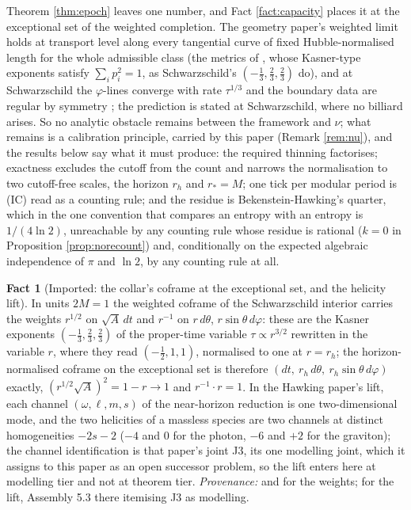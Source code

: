 \documentclass[11pt]{article}
\theoremstyle{definition}
\newtheorem{fact}[theorem]{Fact}
\begin{document}
Theorem \ref{thm:epoch} leaves one number, and Fact \ref{fact:capacity} places it at the exceptional set of the weighted completion. The geometry paper's weighted limit holds at transport level along every tangential curve of fixed Hubble-normalised length for the whole admissible class (the metrics of \cite[Def.~5.5]{ButlerT6}, whose Kasner-type exponents satisfy $\sum_i p_i^2 = 1$, as Schwarzschild's $(-\tfrac13, \tfrac23, \tfrac23)$ do), and at Schwarzschild the $\varphi$-lines converge with rate $\tau^{1/3}$ and the boundary data are regular by symmetry \cite[\S 5.5]{ButlerT6}; the prediction is stated at Schwarzschild, where no billiard arises. So no analytic obstacle remains between the framework and $\nu$; what remains is a calibration principle, carried by this paper (Remark \ref{rem:nu}), and the results below say what it must produce: the required thinning factorises; exactness excludes the cutoff from the count and narrows the normalisation to two cutoff-free scales, the horizon $r_h$ and $r_* = M$; one tick per modular period is (IC) read as a counting rule; and the residue is Bekenstein-Hawking's quarter, which in the one convention that compares an entropy with an entropy is $1/(4\ln 2)$, unreachable by any counting rule whose residue is rational ($k = 0$ in Proposition \ref{prop:norecount}) and, conditionally on the expected algebraic independence of $\pi$ and $\ln 2$, by any counting rule at all.

\begin{fact}[Imported: the collar's coframe at the exceptional set, and the helicity lift]\label{fact:collarframe}
In units $2M = 1$ the weighted coframe of the Schwarzschild interior carries the weights $r^{1/2}$ on $\sqrt{A}\,dt$ and $r^{-1}$ on $r\,d\theta$, $r\sin\theta\,d\varphi$: these are the Kasner exponents $(-\tfrac13, \tfrac23, \tfrac23)$ of the proper-time variable $\tau \propto r^{3/2}$ rewritten in the variable $r$, where they read $(-\tfrac12, 1, 1)$, normalised to one at $r = r_h$; the horizon-normalised coframe on the exceptional set is therefore $(dt,\ r_h\,d\theta,\ r_h\sin\theta\,d\varphi)$ exactly, $(r^{1/2}\sqrt{A})^2 = 1 - r \to 1$ and $r^{-1}\cdot r = 1$. In the Hawking paper's lift, each channel $(\omega, \ell, m, s)$ of the near-horizon reduction is one two-dimensional mode, and the two helicities of a massless species are two channels at distinct homogeneities $-2s - 2$ ($-4$ and $0$ for the photon, $-6$ and $+2$ for the graviton); the channel identification is that paper's joint J3, its one modelling joint, which it assigns to this paper as an open successor problem, so the lift enters here at modelling tier and not at theorem tier. \emph{Provenance:} \cite[Lemmas 5.1 to 5.3, Def.~5.5]{ButlerT6} and \cite[Thm.~8.16]{ButlerT4} for the weights; \cite[Fact~5.1, Prop.~5.2, Assembly~5.3]{ButlerT7} for the lift, Assembly 5.3 there itemising J3 as modelling.
\end{fact}
\end{document}
